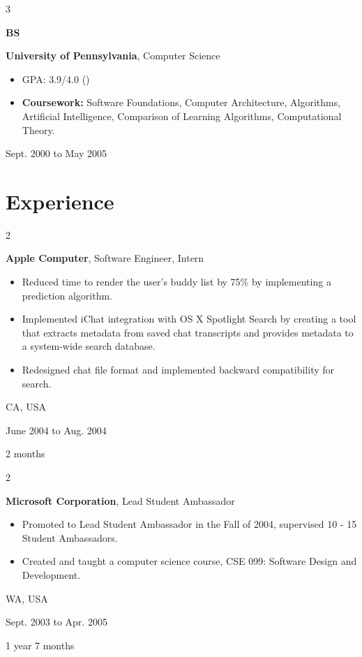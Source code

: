 \documentclass[10pt, letterpaper]{article}
\newenvironment{highlights}{
    \begin{itemize}[
        topsep=0.10 cm,
        parsep=0.10 cm,
        partopsep=0pt,
        itemsep=0pt,
        leftmargin=0.4 cm + 10pt
    ]
}{
    \end{itemize}
} %
\newenvironment{twocolentry}[2][]{
    \onecolentry
    \def\secondColumn{#2}
    \setcolumnwidth{\fill, 4.5 cm}
    \begin{paracol}{2}
}{
    \switchcolumn \raggedleft \secondColumn
    \end{paracol}
    \endonecolentry
} %
\newenvironment{threecolentry}[3][]{
    \onecolentry
    \def\thirdColumn{#3}
    \setcolumnwidth{1 cm, \fill, 4.5 cm}
    \begin{paracol}{3}
    \raggedright #2 \switchcolumn
}{
    \switchcolumn \raggedleft \thirdColumn
    \end{paracol}
    \endonecolentry
} %
\let\hrefWithoutArrow\href
\renewcommand{\href}[2]{\hrefWithoutArrow{#1}{\mbox{\ifthenelse{\equal{#2}{}}{ }{#2 }\raisebox{.15ex}{\footnotesize \faExternalLink*}}}}
\begin{document}
        
        \begin{threecolentry}{\textbf{BS}}{
            Sept. 2000 to May 2005
        }
            \textbf{University of Pennsylvania}, Computer Science
            \begin{highlights}
                \item GPA: 3.9/4.0 (\href{https://example.com}{Transcript})
                \item \textbf{Coursework:} Software Foundations, Computer Architecture, Algorithms, Artificial Intelligence, Comparison of Learning Algorithms, Computational Theory.
            \end{highlights}
        \end{threecolentry}


    
    \section{Experience}

        
        \begin{twocolentry}{
            CA, USA

        June 2004 to Aug. 2004

        2 months
        }
            \textbf{Apple Computer}, Software Engineer, Intern
            \begin{highlights}
                \item Reduced time to render the user's buddy list by 75\% by implementing a prediction algorithm.
                \item Implemented iChat integration with OS X Spotlight Search by creating a tool that extracts metadata from saved chat transcripts and provides metadata to a system-wide search database.
                \item Redesigned chat file format and implemented backward compatibility for search.
            \end{highlights}
        \end{twocolentry}


        \vspace{0.2 cm}

        \begin{twocolentry}{
            WA, USA

        Sept. 2003 to Apr. 2005

        1 year 7 months
        }
            \textbf{Microsoft Corporation}, Lead Student Ambassador
            \begin{highlights}
                \item Promoted to Lead Student Ambassador in the Fall of 2004, supervised 10 - 15 Student Ambassadors.
                \item Created and taught a computer science course, CSE 099: Software Design and Development.
            \end{highlights}
        \end{twocolentry}
\end{document}
